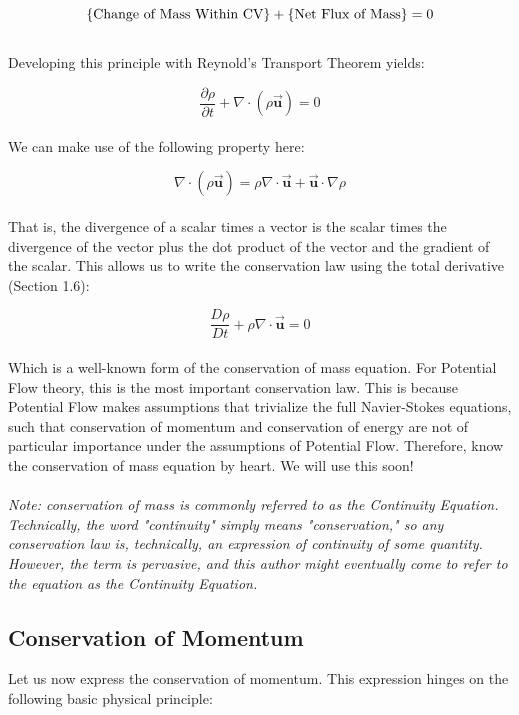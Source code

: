 \documentclass[11pt]{article}
\begin{document}
\begin{equation*}
    \textnormal{\{Change of Mass Within CV\}} + \{\textnormal{Net Flux of Mass} \} = 0
\end{equation*} \\
\noindent
Developing this principle with Reynold's Transport Theorem yields:

\begin{equation*}
    \frac{\partial\rho}{\partial t} + \nabla \cdot (\rho\vec{\bm{u}}) = 0
\end{equation*}\\
\noindent
We can make use of the following property here:

\begin{equation*}
    \nabla \cdot (\rho \vec{\bm{u}}) = \rho \nabla \cdot \vec{\bm{u}} + \vec{\bm{u}} \cdot \nabla \rho
\end{equation*}\\
\noindent
That is, the divergence of a scalar times a vector is the scalar times the divergence of the vector plus the dot product of the vector and the gradient of the scalar. This allows us to write the conservation law using the total derivative (Section 1.6):

\begin{equation}\label{continuity}
    \frac{D\rho}{Dt} + \rho \nabla \cdot \vec{\bm{u}} = 0
\end{equation}\\ 
\noindent
Which is a well-known form of the conservation of mass equation. For Potential Flow theory, this is the most important conservation law. This is because Potential Flow makes assumptions that trivialize the full Navier-Stokes equations, such that conservation of momentum and conservation of energy are not of particular importance under the assumptions of Potential Flow. Therefore, know the conservation of mass equation by heart. We will use this soon! \\ \\
\emph{Note: conservation of mass is commonly referred to as the Continuity Equation. Technically, the word "continuity" simply means "conservation," so any conservation law is, technically, an expression of continuity of some quantity. However, the term is pervasive, and this author might eventually come to refer to the equation as the Continuity Equation.}




\subsection{Conservation of Momentum}
Let us now express the conservation of momentum. This expression hinges on the following basic physical principle:
\end{document}
